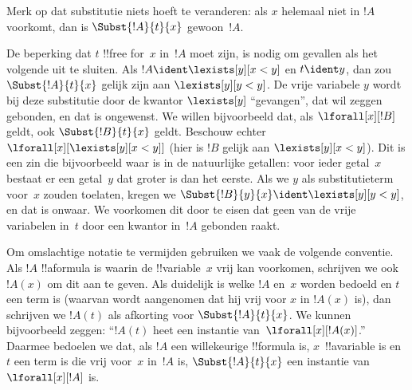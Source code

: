 \documentclass[../../../include/open-logic-section]{subfiles}
\begin{document}
\begin{explain}
Merk op dat substitutie niets hoeft te veranderen: als $x$ helemaal
niet in $!A$ voorkomt, dan is $\Subst{!A}{t}{x}$ gewoon~$!A$.

De beperking dat $t$ !!{free for}~$x$ in~$!A$ moet zijn, is nodig om
gevallen als het volgende uit te sluiten. Als
$!A \ident \lexists[y][x < y]$ en $t \ident y$, dan zou
$\Subst{!A}{t}{x}$ gelijk zijn aan $\lexists[y][y < y]$. De vrije
variabele $y$ wordt bij deze substitutie door de kwantor
$\lexists[y]$ ``gevangen'', dat wil zeggen gebonden, en dat is
ongewenst. We willen bijvoorbeeld dat, als $\lforall[x][!B]$ geldt,
ook $\Subst{!B}{t}{x}$ geldt. Beschouw echter
$\lforall[x][\lexists[y][x < y]]$ (hier is $!B$ gelijk aan
$\lexists[y][x < y]$). Dit is een zin die bijvoorbeeld waar is in de
 natuurlijke getallen: voor ieder getal~$x$ bestaat er een getal~$y$
 dat groter is dan het eerste. Als we $y$ als substitutieterm voor~$x$ zouden
toelaten, kregen we
$\Subst{!B}{y}{x} \ident \lexists[y][y < y]$, en dat is onwaar. We
voorkomen dit door te eisen dat geen van de vrije variabelen in~$t$
door een kwantor in~$!A$ gebonden raakt.
\end{explain}

Om omslachtige notatie te vermijden gebruiken we vaak de volgende
conventie. Als $!A$ !!a{formula} is waarin de !!{variable}~$x$ vrij
kan voorkomen, schrijven we ook~$!A(x)$ om dit aan te geven. Als
duidelijk is welke $!A$ en~$x$ worden bedoeld en $t$ een term is
(waarvan wordt aangenomen dat hij vrij voor $x$ in $!A(x)$ is), dan
schrijven we $!A(t)$ als afkorting voor $\Subst{!A}{t}{x}$. We kunnen
bijvoorbeeld zeggen: ``$!A(t)$ heet een instantie
van~$\lforall[x][!A(x)]$.'' Daarmee bedoelen we dat, als $!A$ een
willekeurige !!{formula} is, $x$~!!a{variable} is en $t$ een term is
die vrij voor~$x$ in~$!A$ is, $\Subst{!A}{t}{x}$ een instantie van
$\lforall[x][!A]$ is.
\end{document}
